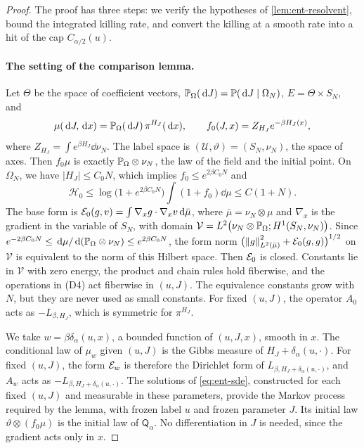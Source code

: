 \begin{proof}
The proof has three steps: we verify the hypotheses of
\cref{lem:ent-resolvent}, bound the integrated killing rate, and convert the
killing at a smooth rate into a hit of the cap $C_{\alpha/2}(u)$.

\paragraph{The setting of the comparison lemma.}
Let $\Theta$ be the space of coefficient vectors, $\mathbb P_\Omega(\,\mathrm d J)
=\mathbb P(\,\mathrm d J\mid\Omega_N)$, $E=\Theta\times S_N$, and
\[
 \mu(\,\mathrm d J,\,\mathrm d x)=\mathbb P_\Omega(\,\mathrm d J)\,\pi^{H_J}(\,\mathrm d x),\qquad
 f_0(J,x)=Z_{H_J}e^{-\beta H_J(x)},
\]
where $Z_{H_J}=\int e^{\beta H_J}\dd\nu_N$. The label space is
$(\mathcal U,\vartheta)=(S_N,\nu_N)$, the space of axes. Then $f_0\mu$ is
exactly $\mathbb P_\Omega\otimes\nu_N$, the law of the field and the initial
point. On $\Omega_N$, we have $|H_J|\le C_0N$, which implies
$f_0\le e^{2\beta C_0N}$ and
\begin{equation}\label{eq:ent-start-entropy}
 \mathcal H_0\le\log\bigl(1+e^{2\beta C_0N}\bigr)\int(1+f_0)\dd\mu
 \le C(1+N).
\end{equation}
The base form is $\mathcal E_0(g,v)=\int\nabla_xg\cdot\nabla_xv\,\mathrm d\bar\mu$, where
$\bar\mu=\nu_N\otimes\mu$ and $\nabla_x$ is the gradient in the variable
of $S_N$, with domain
$\mathcal V=L^2\bigl(\nu_N\otimes\mathbb P_\Omega;H^1(S_N,\nu_N)\bigr)$. Since
$e^{-2\beta C_0N}\le\,\mathrm d\mu/\,\mathrm d(\mathbb P_\Omega\otimes\nu_N)\le e^{2\beta C_0N}$,
the form norm $\bigl(\left\lVert g\right\rVert_{L^2(\bar\mu)}^2+\mathcal E_0(g,g)\bigr)^{1/2}$ on
$\mathcal V$ is equivalent to the norm of this Hilbert space. Then $\mathcal E_0$ is closed. Constants lie in $\mathcal V$ with zero
energy, the product and chain rules hold fiberwise, and the operations in
(D4) act fiberwise in $(u,J)$. The equivalence constants grow with $N$, but
they are never used as small constants. For fixed $(u,J)$, the operator
$A_0$ acts as $-L_{\beta,H_J}$, which is symmetric for $\pi^{H_J}$.

We take $w=\beta\delta_\alpha(u,x)$, a bounded function of $(u,J,x)$, smooth
in $x$. The conditional law of $\mu_w$ given $(u,J)$ is the Gibbs measure
of $H_J+\delta_\alpha(u,\cdot)$. For fixed $(u,J)$, the form $\mathcal E_w$ is
therefore the Dirichlet form of $L_{\beta,H_J+\delta_\alpha(u,\cdot)}$, and $A_w$ acts as
$-L_{\beta,H_J+\delta_\alpha(u,\cdot)}$. The solutions of \eqref{eq:ent-sde},
constructed for each fixed $(u,J)$ and measurable in these parameters,
provide the Markov process required by the lemma, with frozen label $u$ and
frozen parameter $J$. Its initial law $\vartheta\otimes(f_0\mu)$ is the
initial law of $\mathsf Q_\alpha$. No differentiation in $J$ is needed,
since the gradient acts only in $x$.


\end{proof}
